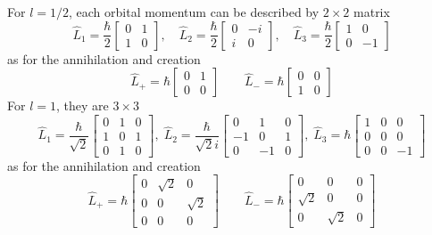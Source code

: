 \documentclass[../../../main.tex]{subfiles}
\begin{document}
For $l=1/2$, each orbital momentum can be described by $2 \times 2$ matrix
\begin{equation*}
    \hat{L}_1 = \frac{\hbar}{2}\begin{bmatrix} 0 & 1 \\ 1 & 0 \end{bmatrix},\quad
    \hat{L}_2 = \frac{\hbar}{2}\begin{bmatrix} 0 & -i \\ i & 0 \end{bmatrix},\quad
    \hat{L}_3 = \frac{\hbar}{2}\begin{bmatrix} 1 & 0 \\ 0 & -1 \end{bmatrix}
\end{equation*}
as for the annihilation and creation
\begin{equation*}
    \hat{L}_{+} = \hbar \begin{bmatrix} 0 & 1 \\ 0 & 0 \end{bmatrix}\qquad
    \hat{L}_{-} = \hbar \begin{bmatrix} 0 & 0 \\ 1 & 0 \end{bmatrix}
\end{equation*}
For $l=1$, they are $3 \times 3$
\begin{equation*}
    \hat{L}_1 = \frac{\hbar}{\sqrt{2}} \begin{bmatrix} 0 & 1 & 0 \\ 1 & 0 & 1 \\ 0 & 1 & 0 \end{bmatrix},\;
    \hat{L}_2 = \frac{\hbar}{\sqrt{2}i} \begin{bmatrix} 0 & 1 & 0 \\ -1 & 0 & 1 \\ 0 & -1 & 0 \end{bmatrix},\;
    \hat{L}_3 = \hbar \begin{bmatrix} 1 & 0 & 0 \\ 0 & 0 & 0 \\ 0 & 0 & -1 \end{bmatrix}
\end{equation*}
as for the annihilation and creation
\begin{equation*}
    \hat{L}_{+} = \hbar \begin{bmatrix} 0 & \sqrt{2} & 0 \\ 0 & 0 & \sqrt{2} \\ 0 & 0 & 0 \end{bmatrix}\qquad
    \hat{L}_{-} = \hbar \begin{bmatrix} 0 & 0 & 0 \\ \sqrt{2} & 0 & 0 \\ 0 & \sqrt{2} & 0 \end{bmatrix}
\end{equation*}
\end{document}
